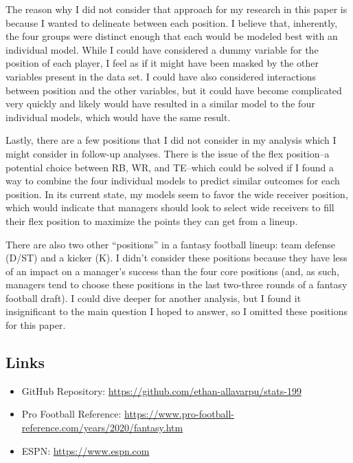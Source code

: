 \documentclass[
]{article}
\providecommand{\tightlist}{%
  \setlength{\itemsep}{0pt}\setlength{\parskip}{0pt}}
\begin{document}
The reason why I did not consider that approach for my research in this
paper is because I wanted to delineate between each position. I believe
that, inherently, the four groups were distinct enough that each would
be modeled best with an individual model. While I could have considered
a dummy variable for the position of each player, I feel as if it might
have been masked by the other variables present in the data set. I could
have also considered interactions between position and the other
variables, but it could have become complicated very quickly and likely
would have resulted in a similar model to the four individual models,
which would have the same result.

Lastly, there are a few positions that I did not consider in my analysis
which I might consider in follow-up analyses. There is the issue of the
flex position--a potential choice between RB, WR, and TE--which could be
solved if I found a way to combine the four individual models to predict
similar outcomes for each position. In its current state, my models seem
to favor the wide receiver position, which would indicate that managers
should look to select wide receivers to fill their flex position to
maximize the points they can get from a lineup.

There are also two other ``positions'' in a fantasy football lineup:
team defense (D/ST) and a kicker (K). I didn't consider these positions
because they have less of an impact on a manager's success than the four
core positions (and, as such, managers tend to choose these positions in
the last two-three rounds of a fantasy football draft). I could dive
deeper for another analysis, but I found it insignificant to the main
question I hoped to answer, so I omitted these positions for this paper.

\newpage

\hypertarget{links}{%
\subsection{Links}\label{links}}

\begin{itemize}
\tightlist
\item
  GitHub Repository: \url{https://github.com/ethan-allavarpu/stats-199}
\item
  Pro Football Reference:
  \url{https://www.pro-football-reference.com/years/2020/fantasy.htm}
\item
  ESPN: \url{https://www.espn.com}
\end{itemize}
\end{document}
